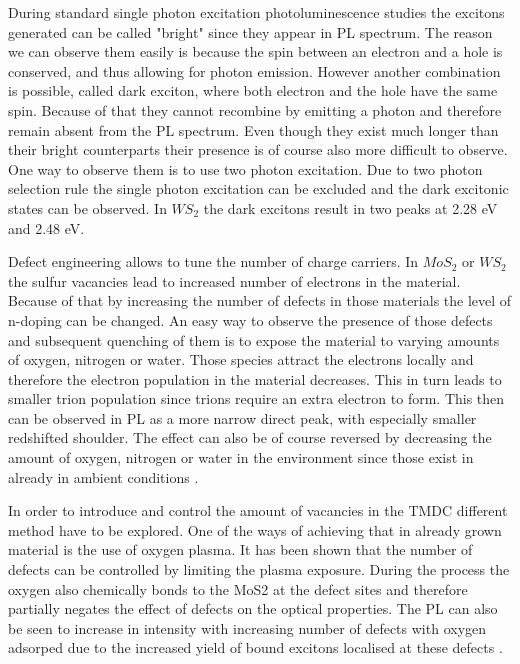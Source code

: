 	During standard single photon excitation photoluminescence studies the excitons generated can be called "bright" since they appear in PL spectrum. The reason we can observe them easily is because the spin between an electron and a hole is conserved, and thus allowing for photon emission. However another combination is possible, called dark exciton, where both electron and the hole have the same spin. Because of that they cannot recombine by emitting a photon and therefore remain absent from the PL spectrum. Even though they exist much longer than their bright counterparts their presence is of course also more difficult to observe. One way to observe them is to use two photon excitation. Due to two photon selection rule the single photon excitation can be excluded and the dark excitonic states can be observed. In $WS_2$ the dark excitons result in two peaks at 2.28 eV and 2.48 eV. \cite{Ye2014}
	
	Defect engineering allows to tune the number of charge carriers. In $MoS_2$ or $WS_2$ the sulfur vacancies lead to increased number of electrons in the material. Because of that by increasing the number of defects in those materials the level of n-doping can be changed. An easy way to observe the presence of those defects and subsequent quenching of them is to expose the material to varying amounts of oxygen, nitrogen or water. Those species attract the electrons locally and therefore the electron population in the material decreases. This in turn leads to smaller trion population since trions require an extra electron to form. This then can be observed in PL as a more narrow direct peak, with especially smaller redshifted shoulder. The effect can also be of course reversed by decreasing the amount of oxygen, nitrogen or water in the environment since those exist in already in ambient conditions \cite{Currie2015}.
	
	In order to introduce and control the amount of vacancies in the TMDC different method have to be explored. One of the ways of achieving that in already grown material is the use of oxygen plasma. It has been shown that the number of defects can be controlled by limiting the plasma exposure. During the process the oxygen also chemically bonds to the MoS2 at the defect sites and therefore partially negates the effect of defects on the optical properties. The PL can also be seen to increase in intensity with increasing number of defects with oxygen adsorped due to the increased yield of bound excitons localised at these defects \cite{Nan2014}.
	
